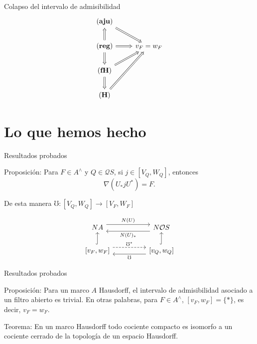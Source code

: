\documentclass[compress,12pt]{beamer}
\begin{document}
    \begin{frame}[fragile]{Colapso del intervalo de admisibilidad}
        \[\begin{tikzcd}
        {(\mathbf{aju})} \\
        {(\mathbf{reg})} & {v_F=w_F} \\
        {(\mathbf{fH})} \\
        {(\mathbf{H})}
        \arrow[Rightarrow, from=1-1, to=2-2]
        \arrow[Rightarrow, from=2-1, to=1-1]
        \arrow[Rightarrow, from=2-1, to=2-2]
        \arrow[Rightarrow, from=2-1, to=3-1]
        \arrow[Rightarrow, from=3-1, to=2-2]
        \arrow[Rightarrow, from=3-1, to=4-1]
        \arrow[Rightarrow, from=4-1, to=2-2]
    \end{tikzcd}\]
    \end{frame}

    \section{Lo que hemos hecho}
\begin{frame}[fragile]{Resultados probados}
    \begin{block}{Proposición:}
        Para $F\in A^\wedge$ y $Q\in \mathcal{Q}S$, si $j\in [V_Q, W_Q]$, entonces 
    \[
    \nabla(U_* j U^*)=F.
    \]
    \end{block}

    De esta manera $\mho\colon [V_Q, W_Q]\to [V_F, W_F]$
    
    \[\begin{tikzcd}
        NA && {N\mathcal{O}S} \\
        {[v_F, w_F]} && {[v_Q, w_Q]}
        \arrow["{N(U)}", shift left=2, from=1-1, to=1-3]
        \arrow["{N(U)_*}", shift left=2, from=1-3, to=1-1]
        \arrow[hook, from=2-1, to=1-1]
        \arrow["\mho^*", shift left=2, dashed, from=2-1, to=2-3]
        \arrow[hook, from=2-3, to=1-3]
        \arrow["\mho", shift left=2, from=2-3, to=2-1]
    \end{tikzcd}\]
\end{frame}

\begin{frame}{Resultados probados}
\begin{block}{Proposición:}
Para un marco $A$ Hausdorff, el intervalo de admisibilidad asociado a un filtro abierto es trivial. En otras palabras, para $F\in A^\wedge$, $[v_F, w_F]=\{*\}$, es decir, $v_F=w_F$.
\end{block}

\begin{block}{Teorema:}
En un marco Hausdorff todo cociente compacto es isomorfo a un cociente cerrado de la topología de un espacio Hausdorff.
\end{block}
\end{frame}
\end{document}

